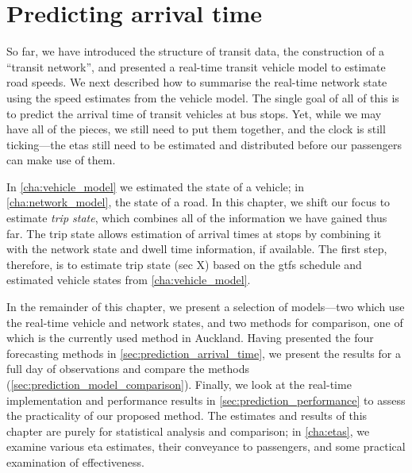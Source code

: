 \chapter{Predicting arrival time}
\label{cha:prediction}


So far, we have introduced the structure of transit data, the construction of a ``transit network'', and presented a real-time transit vehicle model to estimate road speeds. We next described how to summarise the real-time network state using the speed estimates from the vehicle model. The single goal of all of this is to predict the arrival time of transit vehicles at bus stops. Yet, while we may have all of the pieces, we still need to put them together, and the clock is still ticking---the \glspl{eta} still need to be estimated and distributed before our passengers can make use of them.

In \cref{cha:vehicle_model} we estimated the state of a vehicle; in \cref{cha:network_model}, the state of a road. In this chapter, we shift our focus to estimate \emph{trip state}, which combines all of the information we have gained thus far. The trip state allows estimation of arrival times at stops by combining it with the network state and dwell time information, if available. The first step, therefore, is to estimate trip state (sec X) based on the \gls{gtfs} schedule and estimated vehicle states from \cref{cha:vehicle_model}.

In the remainder of this chapter, we present a selection of models---two which use the real-time vehicle and network states, and two methods for comparison, one of which is the currently used method in Auckland. Having presented the four forecasting methods in \cref{sec:prediction_arrival_time}, we present the results for a full day of observations and compare the methods (\cref{sec:prediction_model_comparison}). Finally, we look at the real-time implementation and performance results in \cref{sec:prediction_performance} to assess the practicality of our proposed method. The estimates and results of this chapter are purely for statistical analysis and comparison; in \cref{cha:etas}, we examine various \gls{eta} estimates, their conveyance to passengers, and some practical examination of effectiveness.








